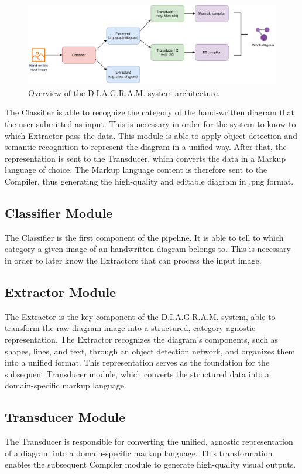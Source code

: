 \documentclass[conference]{IEEEtran}
\begin{document}
\begin{figure}[H]
\centering
\includegraphics[width=\linewidth]{overview.png}
\caption{Overview of the D.I.A.G.R.A.M. system architecture.}
\label{fig:pipeline}
\end{figure}

The Classifier is able to recognize the category of the hand-written diagram that the user submitted as input. This is necessary in order for the system to know to which Extractor pass the data. This module is able to apply object detection and semantic recognition to represent the diagram in a unified way. After that, the representation is sent to the Transducer, which converts the data in a Markup language of choice. The Markup language content is therefore sent to the Compiler, thus generating the high-quality and editable diagram in .png format.

\subsection{Classifier Module}
The Classifier is the first component of the pipeline. It is able to tell to which category a given image of an handwritten diagram belongs to. This is necessary in order to later know the Extractors that can process the input image.
\subsection{Extractor Module}
The Extractor is the key component of the D.I.A.G.R.A.M. system, able to transform the raw diagram image into a structured, category-agnostic representation.
The Extractor recognizes the diagram's components, such as shapes, lines, and text, through an object detection network, and organizes them into a unified format. This representation serves as the foundation for the subsequent Transducer module, which converts the structured data into a domain-specific markup language.
\subsection{Transducer Module}
The Transducer is responsible for converting the unified, agnostic representation of a diagram into a domain-specific markup language. 
This transformation enables the subsequent Compiler module to generate high-quality visual outputs.
\end{document}
